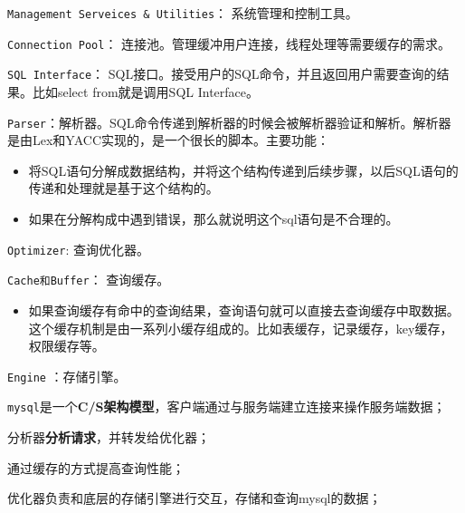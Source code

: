 \documentclass[UTF8,a4paper,12pt]{ctexbook}
\begin{document}
			\verb|Management Serveices & Utilities|： 系统管理和控制工具。
			
			\verb|Connection Pool|： 连接池。管理缓冲用户连接，线程处理等需要缓存的需求。
			
			\verb|SQL Interface|： SQL接口。接受用户的SQL命令，并且返回用户需要查询的结果。比如select from就是调用SQL Interface。
			
			\verb|Parser|：解析器。SQL命令传递到解析器的时候会被解析器验证和解析。解析器是由Lex和YACC实现的，是一个很长的脚本。主要功能：
				\begin{itemize}[itemindent = 1em]
					\item 将SQL语句分解成数据结构，并将这个结构传递到后续步骤，以后SQL语句的传递和处理就是基于这个结构的。
					\item 如果在分解构成中遇到错误，那么就说明这个sql语句是不合理的。
				\end{itemize}
			
			\verb|Optimizer|: 查询优化器。
			
			\verb|Cache和Buffer|： 查询缓存。
				\begin{itemize}[itemindent = 1em]
					\item 如果查询缓存有命中的查询结果，查询语句就可以直接去查询缓存中取数据。这个缓存机制是由一系列小缓存组成的。比如表缓存，记录缓存，key缓存，权限缓存等。
				\end{itemize}
			
			\verb|Engine| ：存储引擎。
					
			
			\verb|mysql|是一个\textbf{C/S架构模型}，客户端通过与服务端建立连接来操作服务端数据；
			
			分析器\textbf{分析请求}，并转发给优化器；
			
			通过缓存的方式提高查询性能；	
			
			优化器负责和底层的存储引擎进行交互，存储和查询mysql的数据；
		
\end{document}
